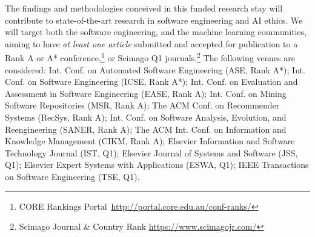 The findings and methodologies conceived in this funded research stay will contribute to state-of-the-art research in software engineering and AI ethics. %
We will target both the software engineering, and the machine learning communities, aiming to have \emph{at least one article} submitted and accepted for publication to a Rank A or A* conference,\footnote{CORE Rankings Portal~\url{http://portal.core.edu.au/conf-ranks/}} or %
Scimago Q1 journals.\footnote{Scimago Journal \& Country Rank \url{https://www.scimagojr.com/}} %
The following venues are considered: Int. Conf. on Automated Software Engineering (ASE, Rank A*); Int. Conf. on Software Engineering (ICSE, Rank A*); Int. Conf. on Evaluation and Assessment in Software Engineering (EASE, Rank A); Int. Conf. on Mining Software Repositories (MSR, Rank A); The ACM Conf. on Recommender Systems (RecSys, Rank A); Int. Conf. on Software Analysis, Evolution, and Reengineering (SANER, Rank A); The ACM Int. Conf. on Information and Knowledge Management (CIKM, Rank A); Elsevier Information and Software Technology Journal (IST, Q1); Elsevier Journal of Systems and Software (JSS, Q1); Elsevier Expert Systems with Applications (ESWA, Q1); IEEE Transactions on Software Engineering (TSE, Q1).

\vspace{-.4cm}





